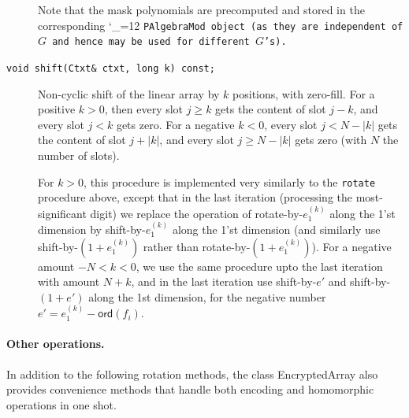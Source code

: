 \documentclass[14pt]{extarticle}
\def\ord{\mathsf{ord}}
\def\EncryptedArray{\textsf{EncryptedArray}}
\def\class{%
\begingroup\catcode`\_=12\relax
\classwitharg}
\def\classwitharg#1{\tt #1\endgroup}
\begin{document}
\begin{description}
Note that the mask polynomials are precomputed and stored in the
corresponding \class{PAlgebraMod} object (as they are independent 
of $G$ and hence may be used for different $G$'s).


\item[\texttt{void shift(Ctxt\& ctxt, long k) const;}]
Non-cyclic shift of the linear array by $k$ positions, with zero-fill.
For a positive $k>0$, then every slot $j\ge k$ gets  the content of
slot $j-k$, and every slot $j<k$ gets zero. For a negative $k<0$,
every slot $j<N-|k|$ gets the content of slot $j+|k|$, and every
slot $j\ge N-|k|$ gets zero (with $N$ the number of slots).

For $k>0$, this procedure is implemented very similarly to the
\texttt{rotate} procedure above, except that in the last iteration
(processing the most-significant digit) we replace the operation of
rotate-by-$e^{(k)}_1$ along the 1'st dimension by shift-by-$e^{(k)}_1$
along the 1'st dimension (and similarly use shift-by-$(1+e^{(k)}_1)$
rather than rotate-by-$(1+e^{(k)}_1)$). 
For a negative amount $-N<k<0$, we use the same procedure upto the
last iteration with amount $N+k$, and in the last iteration
use shift-by-$e'$ and shift-by-$(1+e')$ along the 1st dimension, for
the negative number $e'=e^{(k)}_1-\ord(f_i)$.
\end{description}

\paragraph{Other operations.} In addition to the following rotation
methods, the class {\EncryptedArray}
also provides convenience methods that handle both encoding and
homomorphic operations in one shot. 
\end{document}
